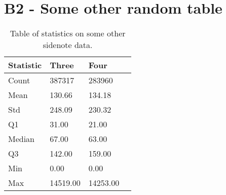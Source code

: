 \newpage
\section*{\large{B2 - Some other random table}}
\vspace*{1cm}

\begin{table}[ht!]
\centering
    \begin{tabular}{ m{4cm} m{2.5cm} m{2.5cm} m{2.5cm} } 
    \toprule
    \toprule
    \textbf{Statistic} & \textbf{Three} & \textbf{Four}  \\
    \midrule
    Count   & 387317    & 283960    \\[1.3ex]
    Mean    & 130.66    & 134.18    \\[1.3ex]
    Std     & 248.09    & 230.32    \\[1.3ex]
    Q1      & 31.00     & 21.00     \\[1.3ex]
    Median  & 67.00     & 63.00     \\[1.3ex]
    Q3      & 142.00    & 159.00    \\[1.3ex]
    Min     & 0.00      & 0.00      \\[1.3ex]
    Max     & 14519.00  & 14253.00  \\[1.3ex]
    \bottomrule
    \bottomrule
    \end{tabular}
\caption[Statistics on something else]{Table of statistics on some other sidenote data.}
\end{table}


